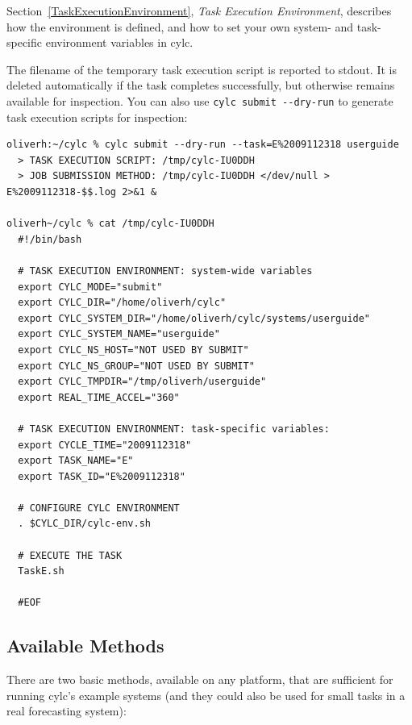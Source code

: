 \documentclass[11pt,a4paper]{article}
\begin{document}
\lstset{language=bash}

Section~\ref{TaskExecutionEnvironment}, {\em Task Execution
Environment}, describes how the environment is defined, and how to set
your own system- and task-specific environment variables in cylc.

The filename of the temporary task execution script is reported to
stdout. It is deleted automatically if the task completes successfully,
but otherwise remains available for inspection.  You can also use
\lstinline=cylc submit --dry-run= to generate task
execution scripts for inspection:


\begin{lstlisting}
oliverh:~/cylc % cylc submit --dry-run --task=E%2009112318 userguide
  > TASK EXECUTION SCRIPT: /tmp/cylc-IU0DDH
  > JOB SUBMISSION METHOD: /tmp/cylc-IU0DDH </dev/null > E%2009112318-$$.log 2>&1 &
  
oliverh~/cylc % cat /tmp/cylc-IU0DDH
  #!/bin/bash
  
  # TASK EXECUTION ENVIRONMENT: system-wide variables
  export CYLC_MODE="submit"
  export CYLC_DIR="/home/oliverh/cylc"
  export CYLC_SYSTEM_DIR="/home/oliverh/cylc/systems/userguide"
  export CYLC_SYSTEM_NAME="userguide"
  export CYLC_NS_HOST="NOT USED BY SUBMIT"
  export CYLC_NS_GROUP="NOT USED BY SUBMIT"
  export CYLC_TMPDIR="/tmp/oliverh/userguide"
  export REAL_TIME_ACCEL="360"
  
  # TASK EXECUTION ENVIRONMENT: task-specific variables:
  export CYCLE_TIME="2009112318"
  export TASK_NAME="E"
  export TASK_ID="E%2009112318"
  
  # CONFIGURE CYLC ENVIRONMENT
  . $CYLC_DIR/cylc-env.sh
  
  # EXECUTE THE TASK
  TaskE.sh 
  
  #EOF
\end{lstlisting}

\subsection{Available Methods}
\label{AvailableMethods}

\lstset{language=bash}

There are two basic methods, available on any platform, that are
sufficient for running cylc's example systems (and they could also be
used for small tasks in a real forecasting system): 
\end{document}

